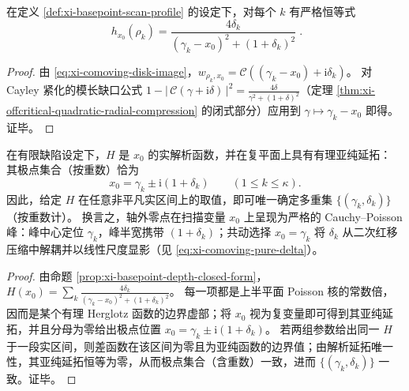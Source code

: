 \begin{proposition}[共动深度的闭式]\label{prop:xi-basepoint-depth-closed-form}
在定义 \ref{def:xi-basepoint-scan-profile} 的设定下，对每个 \(k\) 有严格恒等式
\[
\boxed{\;
h_{x_0}(\rho_k)=\frac{4\delta_k}{(\gamma_k-x_0)^2+(1+\delta_k)^2}\; }.
\]
\end{proposition}

\begin{proof}
由 \eqref{eq:xi-comoving-disk-image}，\(w_{\rho_k,x_0}=\mathcal{C}((\gamma_k-x_0)+\mathrm{i}\delta_k)\)。
对 Cayley 紧化的模长缺口公式 \(1-|\,\mathcal{C}(\gamma+\mathrm{i}\delta)\,|^2=\frac{4\delta}{\gamma^2+(1+\delta)^2}\)（定理 \ref{thm:xi-offcritical-quadratic-radial-compression} 的闭式部分）应用到 \(\gamma\mapsto \gamma_k-x_0\) 即得。证毕。
\end{proof}

\begin{theorem}\label{thm:xi-basepoint-scan-inversion-uniqueness}
在有限缺陷设定下，\(H\) 是 \(x_0\) 的实解析函数，并在复平面上具有有理亚纯延拓：
其极点集合（按重数）恰为
\[
x_0=\gamma_k\pm \mathrm{i}(1+\delta_k)\qquad(1\le k\le\kappa).
\]
因此，给定 \(H\) 在任意非平凡实区间上的取值，即可唯一确定多重集 \(\{(\gamma_k,\delta_k)\}\)（按重数计）。
换言之，轴外零点在扫描变量 \(x_0\) 上呈现为严格的 Cauchy--Poisson 峰：峰中心定位 \(\gamma_k\)，峰半宽携带 \((1+\delta_k)\)；共动选择 \(x_0=\gamma_k\) 将 \(\delta_k\) 从二次红移压缩中解耦并以线性尺度显影（见 \eqref{eq:xi-comoving-pure-delta}）。
\end{theorem}

\begin{proof}
由命题 \ref{prop:xi-basepoint-depth-closed-form}，
\(
H(x_0)=\sum_k \frac{4\delta_k}{(\gamma_k-x_0)^2+(1+\delta_k)^2}
\)。
每一项都是上半平面 Poisson 核的常数倍，因而是某个有理 Herglotz 函数的边界虚部；将 \(x_0\) 视为复变量即可得到其亚纯延拓，并且分母为零给出极点位置 \(x_0=\gamma_k\pm \mathrm{i}(1+\delta_k)\)。
若两组参数给出同一 \(H\) 于一段实区间，则差函数在该区间为零且为亚纯函数的边界值；由解析延拓唯一性，其亚纯延拓恒等为零，从而极点集合（含重数）一致，进而 \(\{(\gamma_k,\delta_k)\}\) 一致。证毕。
\end{proof}






